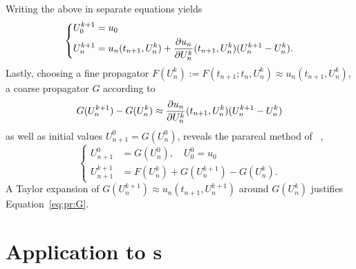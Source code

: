 Writing the above in separate equations yields
\begin{equation}
  \left\{
  \begin{aligned}
    U^{k+1}_0 &= u_0 \\
    U^{k+1}_n &= u_n(t_{n+1}, U^k_n) + \pdiff{U^k_n}{u_n}(t_{n+1}, U^k_n) (U^{k+1}_n - U^k_n).
  \end{aligned}
  \right.
\end{equation}
Lastly, choosing a fine propagator $F(U^k_n) := F(t_{n+1}; t_n, U^k_n) \approx u_n(t_{n+1}, U^k_n)$,
a coarse propagator $G$ according to
\begin{equation}
  \label{eq:pr:G}
  G(U^{k+1}_n) - G(U^k_n)
  \approx
  \pdiff{U^k_n}{u_n}(t_{n+1}, U^k_n) (U^{k+1}_n - U^k_n)
\end{equation}
as well as initial values $ U^0_{n+1} = G(U^0_n) $,
reveals the parareal method of \citeauthor{Baffico2002}~\cite{Baffico2002},
\begin{equation}
  \left\{
  \begin{aligned}
    U^0_{n+1} &= G(U^0_n),
    \quad
    U^0_0 = u_0 \\
    U^{k+1}_{n+1} &= F(U^k_n) + G(U^{k+1}_n) - G(U^k_n)
    .
  \end{aligned}
  \right.
\end{equation}
A Taylor expansion of $G(U^{k+1}_n) \approx u_n(t_{n+1}, U^{k+1}_n)$ around $G(U^k_n)$ justifies Equation~\eqref{eq:pr:G}.

\section{Application to \texorpdfstring{s}{LRSIFs}}
\label{sec:pr:DRE}

